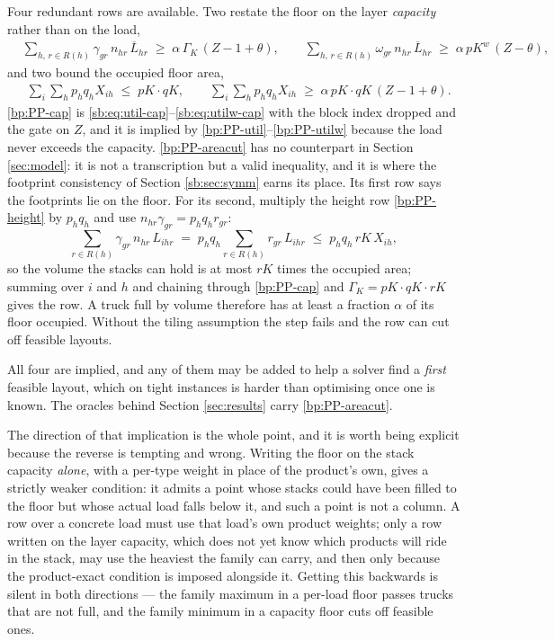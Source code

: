 Four redundant rows are available. Two restate the floor on the layer
\emph{capacity} rather than on the load,
\begin{align}
  & \sum_{h,\,r \in R(h)} \gamma_{gr}\,n_{hr}\,\overline{L}_{hr}
      \;\ge\;\alpha\,\Gamma_{K}\,(Z-1+\theta), \qquad
    \sum_{h,\,r \in R(h)} \omega_{gr}\,n_{hr}\,\overline{L}_{hr}
      \;\ge\;\alpha\,\mathit{pK}^{w}\,(Z-\theta),
    \label{bp:PP-cap}
\end{align}
and two bound the occupied floor area,
\begin{align}
  & \sum_{i}\sum_{h} p_{h}q_{h}X_{ih} \;\le\; \mathit{pK}\cdot\mathit{qK},
    \qquad
    \sum_{i}\sum_{h} p_{h}q_{h}X_{ih}
      \;\ge\;\alpha\,\mathit{pK}\cdot\mathit{qK}\,(Z-1+\theta).
    \label{bp:PP-areacut}
\end{align}
\eqref{bp:PP-cap} is \eqref{sb:eq:util-cap}--\eqref{sb:eq:utilw-cap}
with the block index dropped and the gate on $Z$, and it is implied by
\eqref{bp:PP-util}--\eqref{bp:PP-utilw} because the load never exceeds
the capacity. \eqref{bp:PP-areacut} has no counterpart in Section
\ref{sec:model}: it is not a transcription but a valid inequality, and
it is where the footprint consistency of Section \ref{sb:sec:symm}
earns its place. Its first row says the footprints lie on the floor.
For its second, multiply the height row \eqref{bp:PP-height} by
$p_{h}q_{h}$ and use $n_{hr}\gamma_{gr}=p_{h}q_{h}r_{gr}$:
\[
  \sum_{r\in R(h)} \gamma_{gr}\,n_{hr}\,L_{ihr}
  \;=\;p_{h}q_{h}\sum_{r\in R(h)} r_{gr}\,L_{ihr}
  \;\le\;p_{h}q_{h}\,\mathit{rK}\,X_{ih},
\]
so the volume the stacks can hold is at most $\mathit{rK}$ times the
occupied area; summing over $i$ and $h$ and chaining through
\eqref{bp:PP-cap} and $\Gamma_{K}=\mathit{pK}\cdot\mathit{qK}\cdot
\mathit{rK}$ gives the row. A truck full by volume therefore has at
least a fraction $\alpha$ of its floor occupied. Without the tiling
assumption the step fails and the row can cut off feasible layouts.

All four are implied, and any of them may be added to help a solver
find a \emph{first} feasible layout, which on tight instances is harder
than optimising once one is known. The oracles behind Section
\ref{sec:results} carry \eqref{bp:PP-areacut}.

The direction of that implication is the whole point, and it is worth
being explicit because the reverse is tempting and wrong. Writing the
floor on the stack capacity \emph{alone}, with a per-type weight in
place of the product's own, gives a strictly weaker condition: it admits
a point whose stacks could have been filled to the floor but whose
actual load falls below it, and such a point is not a column. A row over
a concrete load must use that load's own product weights; only a row
written on the layer capacity, which does not yet know which products
will ride in the stack, may use the heaviest the family can carry, and
then only because the product-exact condition is imposed alongside
it. Getting this backwards is
silent in both directions --- the family maximum in a per-load floor
passes trucks that are not full, and the family minimum in a
capacity floor cuts off feasible ones.

